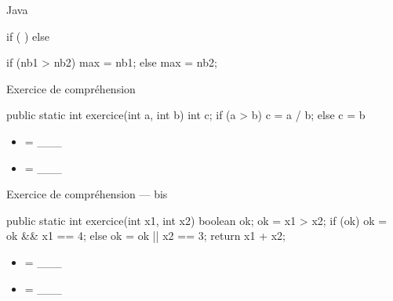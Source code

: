 \begin{frame}[fragile]{Java}
\begin{grammaire}
  if (  )
  else
\end{grammaire}
  \pause

  \begin{java}
if (nb1 > nb2){
    max = nb1;
} else {
    max = nb2;
}
  \end{java}
\end{frame}

\begin{frame}[fragile]{Exercice de compréhension}
  \begin{java}
public static int exercice(int a, int b) {
    int c;
    if (a > b) {
        c = a / b;
    } else {
        c = b %
    }
}
  \end{java}

  \begin{multicols}{2}
    \begin{itemize}[<+->]
      \item {} = \_\_\_
      \item {} = \_\_\_
    \end{itemize}
  \end{multicols}
\end{frame}

\begin{frame}[fragile]{Exercice de compréhension --- bis}
  \begin{java}
public static int exercice(int x1, int x2) {
    boolean ok;
    ok = x1 > x2;
    if (ok) {
        ok = ok && x1 == 4;
    } else {
        ok = ok || x2 == 3;
    }
    return x1 + x2;
}
    \end{java}

    \medskip
    \begin{multicols}{2}
    \begin{itemize}
    \item {} = \_\_\_
    \item {} = \_\_\_
    \end{itemize}
    \end{multicols}
\end{frame}

